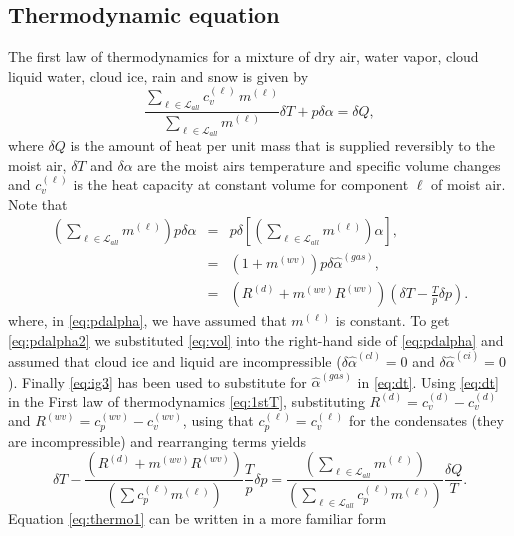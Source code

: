 \documentclass{agujournal}
\begin{document}
\subsection{Thermodynamic equation}
The first law of thermodynamics for a mixture of dry air, water vapor, cloud liquid water, cloud ice, rain and snow is given by
\begin{equation}
\frac{\sum_{\ell\in \mathcal{L}_{all}} c_{v}^{(\ell)}\, m^{(\ell)}}{\sum_{\ell\in \mathcal{L}_{all}} m^{(\ell)}}\delta T+p\delta \alpha=\delta Q,\label{eq:1stT}
\end{equation}
where $\delta Q$ is the amount of heat per unit mass that is supplied reversibly to the moist air, $\delta T$ and $\delta \alpha$ are the moist airs temperature and specific volume changes and $c_v^{(\ell)}$ is the heat capacity at constant volume for component $\ell$ of moist air. Note that
\begin{eqnarray}
\left( \sum_{\ell \in \mathcal{L}_{all}} m^{(\ell)}\right)p\delta \alpha &=& p \delta \left[ \left( \sum_{\ell \in \mathcal{L}_{all}} m^{(\ell)} \right)\alpha  \right],\label{eq:pdalpha}\\
                                       &=& (1+m^{(wv)})p\delta \hat{\alpha}^{(gas)},\label{eq:pdalpha2}\\
                                       &=& \left(R^{(d)}+m^{(wv)}R^{(wv)}\right)\left(\delta T-\frac{T}{p}\delta p\right)\label{eq:dt}.
\end{eqnarray}
where, in \eqref{eq:pdalpha}, we have assumed that $m^{(\ell)}$ is constant. To get \eqref{eq:pdalpha2} we substituted \eqref{eq:vol} into the right-hand side of \eqref{eq:pdalpha} and assumed that cloud ice and liquid are incompressible ($\delta \hat{\alpha}^{(cl)}=0$ and $\delta \hat{\alpha}^{(ci)}=0$). Finally \eqref{eq:ig3} has been used to substitute for $\hat{\alpha}^{(gas)}$ in \eqref{eq:dt}.
Using \eqref{eq:dt} in the First law of thermodynamics \eqref{eq:1stT}, substituting $R^{(d)}=c_v^{(d)}-c_v^{(d)}$ and $R^{(wv)}=c_p^{(wv)}-c_{v}^{(wv)}$, using that $c_p^{(\ell)}=c^{(\ell)}_v$ for the condensates (they are incompressible) and rearranging terms yields
\begin{equation}
\delta T-\frac{\left(R^{(d)}+m^{(wv)}R^{(wv)}\right)}{\left(\sum c_p^{(\ell)}m^{(\ell)}\right)}\frac{T}{p}\delta p=\frac{\left(\sum_{\ell \in \mathcal{L}_{all}} m^{(\ell)}\right)}{\left(\sum_{\ell \in \mathcal{L}_{all}} c_p^{(\ell)}m^{(\ell)}\right)}\frac{\delta Q}{T}.\label{eq:thermo1}
\end{equation}
Equation \eqref{eq:thermo1} can be written in a more familiar form
\end{document}
